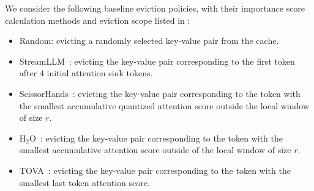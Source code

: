 We consider the following baseline eviction policies, with their importance score calculation methods and eviction scope listed in :
\begin{itemize}[itemsep=1pt,parsep=2pt,topsep=1pt]
    \item Random: evicting a randomly selected key-value pair from the cache.
    \item StreamLLM~\cite{xiao2023efficient}: evicting the key-value pair corresponding to the first token after 4 initial attention sink tokens.
    \item ScissorHands~\cite{liu2023scissorhands}: evicting the key-value pair corresponding to the token with the smallest accumulative quantized attention score outside the local window of size $r$.
    \item H$_{\text{2}}$O~\cite{h2o}: evicting the key-value pair corresponding to the token with the smallest accumulative attention score outside of the local window of size $r$.
    \item TOVA~\cite{tova}: evicting the key-value pair corresponding to the token with the smallest last token attention score.
\end{itemize}
